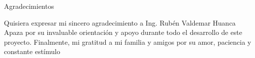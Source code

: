 \begin{agradecimientos}


Agradecimientos

Quisiera expresar mi sincero agradecimiento a Ing. Rubén Valdemar Huanca Apaza 
por su invaluable orientación y apoyo durante todo el desarrollo de este proyecto.
Finalmente, mi gratitud a mi familia y amigos por su amor, paciencia y constante
estímulo

\end{agradecimientos}
